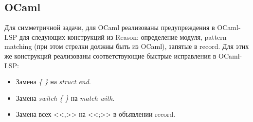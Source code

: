\subsection{OCaml}
Для симметричной задачи, для OCaml реализованы предупреждения в OCaml-LSP для следующих конструкций из Reason: определение модуля, pattern matching (при этом стрелки должны быть из OCaml), запятые в record. Для этих же конструкций реализованы соответствующие быстрые исправления в OCaml-LSP:
\begin{itemize}

\item Замена {\it \{ \}} на {\it struct end}.

\item Замена {\it switch \{ \}} на {\it match with}.

\item Замена всех <<,>> на <<;>> в объявлении record.

\end{itemize}

